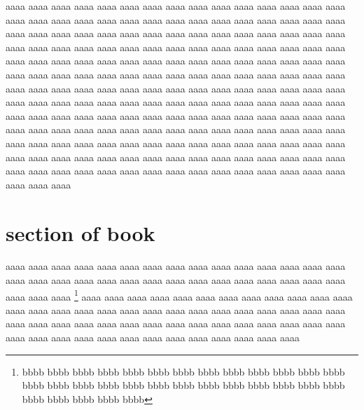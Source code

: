 \documentclass[10pt,dvipdfmx,landscape]{jsarticle}
\begin{document}
aaaa aaaa aaaa aaaa aaaa aaaa aaaa aaaa aaaa aaaa aaaa 
aaaa aaaa aaaa aaaa aaaa aaaa aaaa aaaa aaaa aaaa aaaa 
aaaa aaaa aaaa aaaa aaaa aaaa aaaa aaaa aaaa aaaa aaaa 
aaaa aaaa aaaa aaaa aaaa aaaa aaaa aaaa aaaa aaaa aaaa 
aaaa aaaa aaaa aaaa aaaa aaaa aaaa aaaa aaaa aaaa aaaa 
aaaa aaaa aaaa aaaa aaaa aaaa aaaa aaaa aaaa aaaa aaaa 
aaaa aaaa aaaa aaaa aaaa aaaa aaaa aaaa aaaa aaaa aaaa 
aaaa aaaa aaaa aaaa aaaa aaaa aaaa aaaa aaaa aaaa aaaa 
aaaa aaaa aaaa aaaa aaaa aaaa aaaa aaaa aaaa aaaa aaaa 
aaaa aaaa aaaa aaaa aaaa aaaa aaaa aaaa aaaa aaaa aaaa 
aaaa aaaa aaaa aaaa aaaa aaaa aaaa aaaa aaaa aaaa aaaa 
aaaa aaaa aaaa aaaa aaaa aaaa aaaa aaaa aaaa aaaa aaaa 
aaaa aaaa aaaa aaaa aaaa aaaa aaaa aaaa aaaa aaaa aaaa 
aaaa aaaa aaaa aaaa aaaa aaaa aaaa aaaa aaaa aaaa aaaa 
aaaa aaaa aaaa aaaa aaaa aaaa aaaa aaaa aaaa aaaa aaaa 
aaaa aaaa aaaa aaaa aaaa aaaa aaaa aaaa aaaa aaaa aaaa 
aaaa aaaa aaaa aaaa aaaa aaaa aaaa aaaa aaaa aaaa aaaa 
aaaa aaaa aaaa aaaa aaaa aaaa aaaa aaaa aaaa aaaa aaaa 


\newpage
\section{section of book}
\begin{screen}
\end{screen}
%
aaaa aaaa aaaa aaaa aaaa aaaa aaaa aaaa aaaa aaaa aaaa 
aaaa aaaa aaaa aaaa aaaa aaaa aaaa aaaa aaaa aaaa aaaa 
aaaa aaaa aaaa aaaa aaaa aaaa aaaa aaaa aaaa aaaa aaaa 
\footnote{bbbb bbbb bbbb bbbb bbbb bbbb bbbb bbbb bbbb
bbbb bbbb bbbb bbbb bbbb bbbb bbbb bbbb bbbb bbbb bbbb 
bbbb bbbb bbbb bbbb bbbb bbbb bbbb bbbb bbbb bbbb bbbb} 
aaaa aaaa aaaa aaaa aaaa aaaa aaaa aaaa aaaa aaaa aaaa 
aaaa aaaa aaaa aaaa aaaa aaaa aaaa aaaa aaaa aaaa aaaa 
aaaa aaaa aaaa aaaa aaaa aaaa aaaa aaaa aaaa aaaa aaaa 
aaaa aaaa aaaa aaaa aaaa aaaa aaaa aaaa aaaa aaaa aaaa 
aaaa aaaa aaaa aaaa aaaa aaaa aaaa aaaa aaaa aaaa aaaa 
\end{document}
